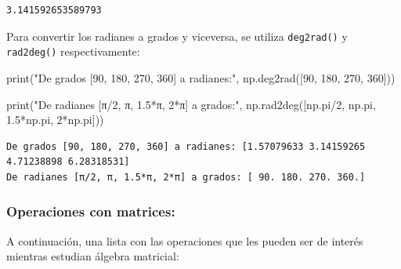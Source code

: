 \documentclass[
  letterpaper,
  DIV=11,
  numbers=noendperiod]{scrreprt}
\newenvironment{Shaded}{\begin{snugshade}}{\end{snugshade}}
\newcommand{\BuiltInTok}[1]{\textcolor[rgb]{0.00,0.23,0.31}{#1}}
\newcommand{\DecValTok}[1]{\textcolor[rgb]{0.68,0.00,0.00}{#1}}
\newcommand{\FloatTok}[1]{\textcolor[rgb]{0.68,0.00,0.00}{#1}}
\newcommand{\NormalTok}[1]{\textcolor[rgb]{0.00,0.23,0.31}{#1}}
\newcommand{\OperatorTok}[1]{\textcolor[rgb]{0.37,0.37,0.37}{#1}}
\newcommand{\StringTok}[1]{\textcolor[rgb]{0.13,0.47,0.30}{#1}}
\begin{document}
\begin{tcolorbox}
\begin{verbatim}
3.141592653589793
\end{verbatim}

Para convertir los radianes a grados y viceversa, se utiliza
\texttt{deg2rad()} y \texttt{rad2deg()} respectivamente:

\begin{Shaded}
\begin{Highlighting}[]
\BuiltInTok{print}\NormalTok{(}\StringTok{"De grados [90, 180, 270, 360] a radianes:"}\NormalTok{, }
\NormalTok{      np.deg2rad([}\DecValTok{90}\NormalTok{, }\DecValTok{180}\NormalTok{, }\DecValTok{270}\NormalTok{, }\DecValTok{360}\NormalTok{]))}

\BuiltInTok{print}\NormalTok{(}\StringTok{"De radianes [π/2, π, 1.5*π, 2*π] a grados:"}\NormalTok{, }
\NormalTok{      np.rad2deg([np.pi}\OperatorTok{/}\DecValTok{2}\NormalTok{, np.pi, }\FloatTok{1.5}\OperatorTok{*}\NormalTok{np.pi, }\DecValTok{2}\OperatorTok{*}\NormalTok{np.pi]))}
\end{Highlighting}
\end{Shaded}

\begin{verbatim}
De grados [90, 180, 270, 360] a radianes: [1.57079633 3.14159265 4.71238898 6.28318531]
De radianes [π/2, π, 1.5*π, 2*π] a grados: [ 90. 180. 270. 360.]
\end{verbatim}

\end{tcolorbox}

\subsubsection{Operaciones con
matrices:}\label{operaciones-con-matrices}

A continuación, una lista con las operaciones que les pueden ser de
interés mientras estudian álgebra matricial:
\end{document}
